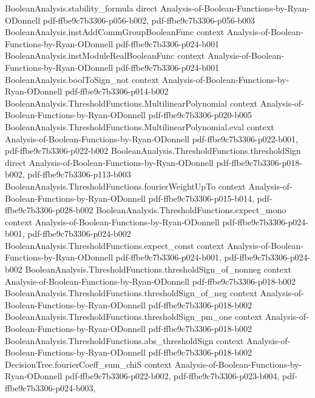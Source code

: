 \begin{theorem}
\proofstep
  {BooleanAnalysis.stability_formula}
  {direct}
  {Analysis-of-Boolean-Functions-by-Ryan-ODonnell}
  {pdf-ffbe9c7b3306-p056-b002,
    pdf-ffbe9c7b3306-p056-b003}
\proofstep
  {BooleanAnalysis.instAddCommGroupBooleanFunc}
  {context}
  {Analysis-of-Boolean-Functions-by-Ryan-ODonnell}
  {pdf-ffbe9c7b3306-p024-b001}
\proofstep
  {BooleanAnalysis.instModuleRealBooleanFunc}
  {context}
  {Analysis-of-Boolean-Functions-by-Ryan-ODonnell}
  {pdf-ffbe9c7b3306-p024-b001}
\proofstep
  {BooleanAnalysis.boolToSign_not}
  {context}
  {Analysis-of-Boolean-Functions-by-Ryan-ODonnell}
  {pdf-ffbe9c7b3306-p014-b002}
\proofstep
  {BooleanAnalysis.ThresholdFunctions.MultilinearPolynomial}
  {context}
  {Analysis-of-Boolean-Functions-by-Ryan-ODonnell}
  {pdf-ffbe9c7b3306-p020-b005}
\proofstep
  {BooleanAnalysis.ThresholdFunctions.MultilinearPolynomial.eval}
  {context}
  {Analysis-of-Boolean-Functions-by-Ryan-ODonnell}
  {pdf-ffbe9c7b3306-p022-b001,
    pdf-ffbe9c7b3306-p022-b002}
\proofstep
  {BooleanAnalysis.ThresholdFunctions.thresholdSign}
  {direct}
  {Analysis-of-Boolean-Functions-by-Ryan-ODonnell}
  {pdf-ffbe9c7b3306-p018-b002,
    pdf-ffbe9c7b3306-p113-b003}
\proofstep
  {BooleanAnalysis.ThresholdFunctions.fourierWeightUpTo}
  {context}
  {Analysis-of-Boolean-Functions-by-Ryan-ODonnell}
  {pdf-ffbe9c7b3306-p015-b014,
    pdf-ffbe9c7b3306-p028-b002}
\proofstep
  {BooleanAnalysis.ThresholdFunctions.expect_mono}
  {context}
  {Analysis-of-Boolean-Functions-by-Ryan-ODonnell}
  {pdf-ffbe9c7b3306-p024-b001,
    pdf-ffbe9c7b3306-p024-b002}
\proofstep
  {BooleanAnalysis.ThresholdFunctions.expect_const}
  {context}
  {Analysis-of-Boolean-Functions-by-Ryan-ODonnell}
  {pdf-ffbe9c7b3306-p024-b001,
    pdf-ffbe9c7b3306-p024-b002}
\proofstep
  {BooleanAnalysis.ThresholdFunctions.thresholdSign_of_nonneg}
  {context}
  {Analysis-of-Boolean-Functions-by-Ryan-ODonnell}
  {pdf-ffbe9c7b3306-p018-b002}
\proofstep
  {BooleanAnalysis.ThresholdFunctions.thresholdSign_of_neg}
  {context}
  {Analysis-of-Boolean-Functions-by-Ryan-ODonnell}
  {pdf-ffbe9c7b3306-p018-b002}
\proofstep
  {BooleanAnalysis.ThresholdFunctions.thresholdSign_pm_one}
  {context}
  {Analysis-of-Boolean-Functions-by-Ryan-ODonnell}
  {pdf-ffbe9c7b3306-p018-b002}
\proofstep
  {BooleanAnalysis.ThresholdFunctions.abs_thresholdSign}
  {context}
  {Analysis-of-Boolean-Functions-by-Ryan-ODonnell}
  {pdf-ffbe9c7b3306-p018-b002}
\proofstep
  {DecisionTree.fourierCoeff_sum_chiS}
  {context}
  {Analysis-of-Boolean-Functions-by-Ryan-ODonnell}
  {pdf-ffbe9c7b3306-p022-b002,
    pdf-ffbe9c7b3306-p023-b004,
    pdf-ffbe9c7b3306-p024-b003,
}
\end{theorem}
